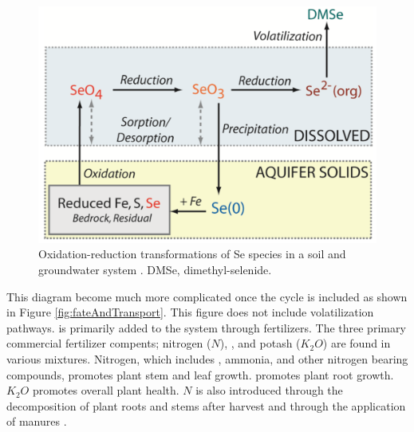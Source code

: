 \begin{linenumbers}[1]
\begin{figure}[htbp]
	\centering
	\includegraphics[scale=.6]{"Figures/SeRedOx"}
	\caption[Oxidation-reduction transformations of Se species in a soil and groundwater system.]{Oxidation-reduction transformations of Se species in a soil and groundwater system  \citep{Bailey2012}.  DMSe, dimethyl-selenide.}
	\label{fig:SeRedOx}
\end{figure}

This diagram become much more complicated once the \nitrate cycle is included as shown in Figure \ref{fig:fateAndTransport}.  This figure does not include volatilization pathways.  \nitrate is primarily added to the system through fertilizers.  The three primary commercial fertilizer compents; nitrogen ($N$), \phosphate, and potash ($K_2O$) are found in various mixtures.  Nitrogen, which includes \nitrate, ammonia, and other nitrogen bearing compounds, promotes plant stem and leaf growth. \phosphate promotes plant root growth.  $K_2O$ promotes overall plant health.  $N$ is also introduced through the decomposition of plant roots and stems after harvest and through the application of manures \citep{Bailey2012}. 


\end{linenumbers}
